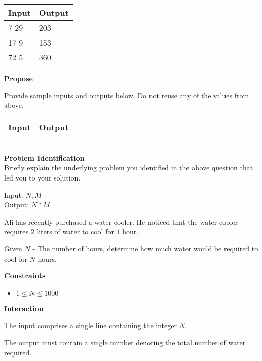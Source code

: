 \documentclass[a4paper]{exam}
\newcommand\heading[1]{\textbf{#1}}
\begin{document}
\begin{questions}
    \begin{tabularx}{\textwidth}{|X|X|}
        \rowcolor{gray!50}
        \hline
        Input & Output \\ \hline\hline
        7 29  & 203    \\\hline
        17 9  & 153    \\\hline
        72 5  & 360    \\\hline
    \end{tabularx}

    \heading{Propose}

    Provide sample inputs and outputs below. Do not reuse any of the values from above.

    \begin{tabularx}{\textwidth}{|X|X|}
        \rowcolor{gray!50}
        \hline
        Input & Output \\ \hline\hline
              &        \\\hline
              &        \\\hline
              &        \\\hline
    \end{tabularx}

    \heading{Problem Identification}\\
    Briefly explain the underlying problem you identified in the above question that led you to your solution.

    \begin{mdframed}
      Input: $N,M$\\
      Output: $N*M$
    \end{mdframed}



    Ali has recently purchased a water cooler. He noticed that the water cooler requires $2$ liters of water to cool for $1$ hour.

    Given $N$ - The number of hours, determine how much water would be required to cool for $N$ hours.

    \heading{Constraints}
    \begin{itemize}
        \item $1 \le N \le 1000$
    \end{itemize}


    \heading{Interaction}

    The input comprises a single line containing the integer $N$.

    The output must contain a single number denoting the total number of water required.\\


\end{questions}
\end{document}
